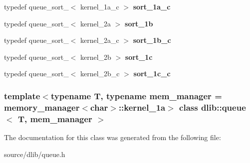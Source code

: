 \begin{DoxyCompactItemize}
\item 
\hypertarget{classdlib_1_1queue_ae2102477620a2276d61c4a8921ccd6b3}{
typedef queue\_\-sort\_$<$ kernel\_\-1a\_\-c $>$ {\bfseries sort\_\-1a\_\-c}}
\label{classdlib_1_1queue_ae2102477620a2276d61c4a8921ccd6b3}

\item 
\hypertarget{classdlib_1_1queue_a3c225e24e6bca0a6c808ac2bd7a86af0}{
typedef queue\_\-sort\_$<$ kernel\_\-2a $>$ {\bfseries sort\_\-1b}}
\label{classdlib_1_1queue_a3c225e24e6bca0a6c808ac2bd7a86af0}

\item 
\hypertarget{classdlib_1_1queue_a83fb0e16148d97bdad71501cfc45b22d}{
typedef queue\_\-sort\_$<$ kernel\_\-2a\_\-c $>$ {\bfseries sort\_\-1b\_\-c}}
\label{classdlib_1_1queue_a83fb0e16148d97bdad71501cfc45b22d}

\item 
\hypertarget{classdlib_1_1queue_a4877f1e730d84149cac55e3bba71c7a5}{
typedef queue\_\-sort\_$<$ kernel\_\-2b $>$ {\bfseries sort\_\-1c}}
\label{classdlib_1_1queue_a4877f1e730d84149cac55e3bba71c7a5}

\item 
\hypertarget{classdlib_1_1queue_ab0617c1ac2328e3641bbcfba8d63988c}{
typedef queue\_\-sort\_$<$ kernel\_\-2b\_\-c $>$ {\bfseries sort\_\-1c\_\-c}}
\label{classdlib_1_1queue_ab0617c1ac2328e3641bbcfba8d63988c}

\end{DoxyCompactItemize}
\subsubsection*{template$<$typename T, typename mem\_\-manager = memory\_\-manager$<$char$>$::kernel\_\-1a$>$ class dlib::queue$<$ T, mem\_\-manager $>$}



The documentation for this class was generated from the following file:\begin{DoxyCompactItemize}
\item 
source/dlib/queue.h\end{DoxyCompactItemize}
